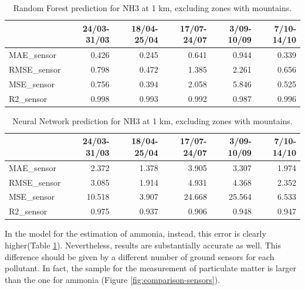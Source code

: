 \begin{table}[H]
\begin{tabular}{lrrrrr}
\toprule
  &  24/03-31/03 &  18/04-25/04 &  17/07-24/07 &  3/09-10/09 &  7/10-14/10 \\
\midrule
 MAE\_sensor &        0.426 &        0.245 &        0.641 &       0.944 &       0.339 \\
RMSE\_sensor &        0.798 &        0.472 &        1.385 &       2.261 &       0.656 \\
 MSE\_sensor &        0.756 &        0.394 &        2.058 &       5.846 &       0.525 \\
  R2\_sensor &        0.998 &        0.993 &        0.992 &       0.987 &       0.996 \\

\bottomrule
\end{tabular}
\caption{Random Forest prediction for NH3 at 1 km, excluding zones with mountains.}
\label{tab:nh3RF}
\end{table}
\begin{table}[H]
\begin{tabular}{lrrrrr}
\toprule
  &  24/03-31/03 &  18/04-25/04 &  17/07-24/07 &  3/09-10/09 &  7/10-14/10 \\
\midrule
 MAE\_sensor &        2.372 &        1.378 &        3.905 &       3.307 &       1.974 \\
RMSE\_sensor &        3.085 &        1.914 &        4.931 &       4.368 &       2.352 \\
 MSE\_sensor &       10.518 &        3.907 &       24.668 &      25.564 &       6.533 \\
  R2\_sensor &        0.975 &        0.937 &        0.906 &       0.948 &       0.947 \\
\bottomrule
\end{tabular}
\caption{Neural Network prediction for NH3 at 1 km, excluding zones with mountains.}
\label{tab:nh3NN}
\end{table}
In the model for the estimation of ammonia, instead, this error is clearly higher(Table \ref{tab:nh3RF}).
Nevertheless, results are substantially accurate as well. 
This difference should be given by a different number of ground sensors for each pollutant. In fact, the sample for the measurement of particulate matter is larger than the one for ammonia (Figure \ref{fig:comparison-sensors}).

